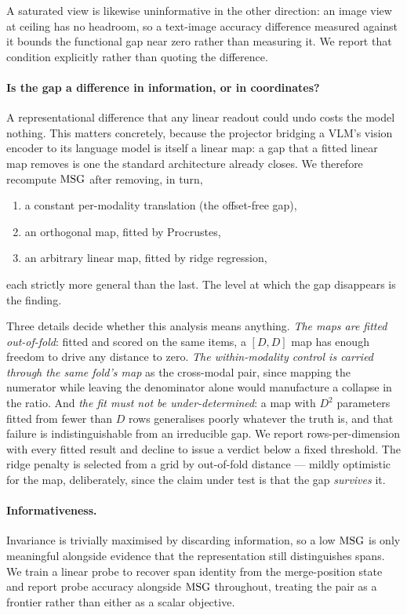 A saturated view is likewise uninformative in the other direction: an image view
at ceiling has no headroom, so a text-image accuracy difference measured against
it bounds the functional gap near zero rather than measuring it. We report that
condition explicitly rather than quoting the difference.

\paragraph{Is the gap a difference in information, or in coordinates?}
A representational difference that any linear readout could undo costs the model
nothing. This matters concretely, because the projector bridging a VLM's vision
encoder to its language model is itself a linear map: a gap that a fitted linear
map removes is one the standard architecture already closes. We therefore
recompute $\mathrm{MSG}$ after removing, in turn,
\begin{enumerate}
    \item a constant per-modality translation (the offset-free gap),
    \item an orthogonal map, fitted by Procrustes,
    \item an arbitrary linear map, fitted by ridge regression,
\end{enumerate}
each strictly more general than the last. The level at which the gap disappears
is the finding.

Three details decide whether this analysis means anything. \emph{The maps are
fitted out-of-fold}: fitted and scored on the same items, a $[D,D]$ map has
enough freedom to drive any distance to zero. \emph{The within-modality control
is carried through the same fold's map} as the cross-modal pair, since mapping
the numerator while leaving the denominator alone would manufacture a collapse
in the ratio. And \emph{the fit must not be under-determined}: a map with $D^2$
parameters fitted from fewer than $D$ rows generalises poorly whatever the truth
is, and that failure is indistinguishable from an irreducible gap. We report
rows-per-dimension with every fitted result and decline to issue a verdict below
a fixed threshold. The ridge penalty is selected from a grid by out-of-fold
distance --- mildly optimistic for the map, deliberately, since the claim under
test is that the gap \emph{survives} it.

\paragraph{Informativeness.}
Invariance is trivially maximised by discarding information, so a low $\mathrm{MSG}$ is
only meaningful alongside evidence that the representation still distinguishes
spans. We train a linear probe to recover span identity from the merge-position
state and report probe accuracy alongside $\mathrm{MSG}$ throughout, treating the pair as
a frontier rather than either as a scalar objective.

